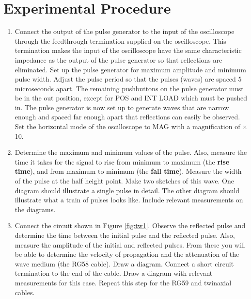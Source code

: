 \section{Experimental Procedure}
\begin{enumerate}

\item Connect the output of the pulse generator to the input of the oscilloscope through the feedthrough termination supplied on the oscilloscope. This termination makes the input of the oscilloscope have the same characteristic impedance as the output of the pulse generator so that reflections are eliminated. Set up the pulse generator for maximum amplitude and minimum pulse width. Adjust the pulse period so that the pulses (waves) are spaced 5 microseconds apart. The remaining pushbuttons on the pulse generator must be in the out position, except for POS and INT LOAD which must be pushed in. The pulse generator is now set up to generate waves that are narrow enough and spaced far enough apart that reflections can easily be observed. Set the horizontal mode of the oscilloscope to MAG with a magnification of $\times$10. 

\item Determine the maximum and minimum values of the pulse. Also, measure the time it takes for the signal to rise from minimum to maximum (the {\bf rise time}), and from maximum to minimum (the {\bf fall time}). Measure the width of the pulse at the half height point. Make two sketches of this wave. One diagram should illustrate a single pulse in detail. The other diagram should illustrate what a train of pulses looks like. Include relevant measurements on the diagrams. 

\item  Connect the circuit shown in Figure \ref{fig:tw1}. Observe the reflected pulse and determine the time between the initial pulse and the reflected pulse. Also, measure the amplitude of the initial and reflected pulses. From these you will be able to determine the velocity of propagation and the attenuation of the wave medium (the RG58 cable). Draw a diagram. Connect a short circuit termination to the end of the cable. Draw a diagram with relevant measurements for this case. Repeat this step for the RG59 and twinaxial cables.


\end{enumerate}
